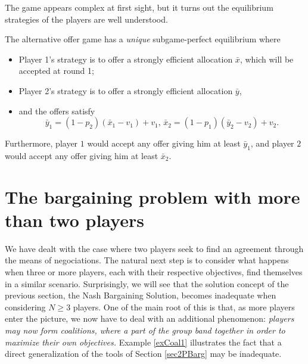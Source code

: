 The game appears complex at first sight, but it turns out the equilibrium strategies of the players are well understood.

\begin{theorem}
The alternative offer game has a \emph{unique} subgame-perfect equilibrium where
\begin{itemize}
\item Player 1's strategy is to offer a strongly efficient allocation $\bar{x}$, which will be accepted at round 1;
\item Player 2's strategy is to offer a strongly efficient allocation $\bar{y}$,
\item and the offers satisfy $$\bar{y}_1 = (1-p_2)(\bar{x}_1 - v_1) + v_1, \, \bar{x}_2 = (1-p_1)(\bar{y}_2 - v_2) + v_2. $$
\end{itemize}
Furthermore, player $1$ would accept any offer giving him at least $\bar{y}_1$, and player $2$ would accept any offer giving him at least $\bar{x}_2$.
\end{theorem}




\section{The bargaining problem with more than two players}


We have dealt with the case where two players seek to find an agreement through the means of negociations. The natural next step is to consider what happens when three or more players, each with their respective objectives, find themselves in a similar scenario. Surprisingly, we will see that the solution concept of the previous section, the Nash Bargaining Solution, becomes inadequate when considering $N \geq 3$ players. One of the main root of this is that, as more players enter the picture, we now have to deal with an additional phenomenon: \emph{players may now form coalitions, where a part of the group band together in order to maximize their own objectives.}
Example \ref{exCoal1} illustrates the fact that a direct generalization of the tools of Section \ref{sec2PBarg} may be inadequate.

